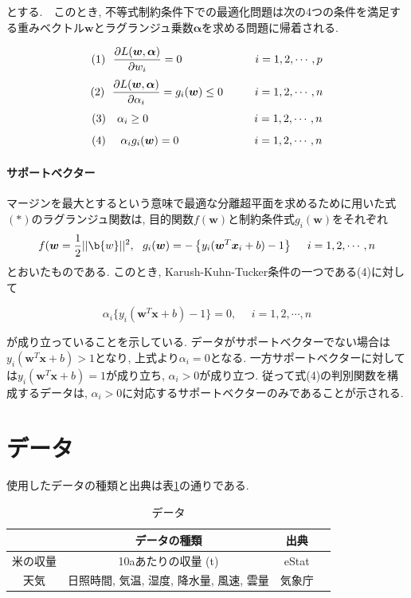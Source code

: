 \documentclass{jarticle}
\begin{document}
とする.　このとき, 不等式制約条件下での最適化問題は次の4つの条件を満足する重みベクトル$\bm{w}$とラグランジュ乗数$\bm{\alpha}$を求める問題に帰着される.

\[(1)\ \ \frac{\partial L(\bm{w}, \bm{\alpha})}{\partial w_i} = 0\ \ \ \hspace{16mm} \ \ \ i=1,2,\cdots, p\]
\[(2)\ \ \frac{\partial L(\bm{w}, \bm{\alpha})}{\partial \alpha_i} = g_i(\bm{w}) \leq 0\hspace{10mm} i=1,2,\cdots, n\]
\[(3)\ \ \ \alpha_i \geq 0\ \ \hspace{30mm}\ i=1,2,\cdots,n\]
\[(4)\ \ \ \ \alpha_i g_i(\bm{w}) = 0\ \ \hspace{10mm} \ \ \ \ \ \ \ \ \ \ i=1,2,\cdots,n\]

\paragraph{サポートベクター}

マージンを最大とするという意味で最適な分離超平面を求めるために用いた式$(*)$のラグランジュ関数は, 目的関数$f(\bm{w})$と制約条件式$g_i(\bm{w})$をそれぞれ
\[f(\bm{w} = \frac{1}{2}||\b{w}||^2,\ \ g_i(\bm{w}) = -\left\{ y_i (\bm{w}^T\bm{x}_i + b) - 1\right\}\ \ \ \ i=1,2,\cdots, n\]
とおいたものである.
このとき, Karush-Kuhn-Tucker条件の一つである(4)に対して

\[\alpha_i \{y_i (\bm{w}^T \bm{x} + b) - 1\} = 0,\ \ \ \ \ \ i=1,2,\cdots,n\]

が成り立っていることを示している. データがサポートベクターでない場合は$y_i(\bm{w}^T \bm{x} + b) >1$となり, 上式より$\alpha_i = 0$となる. 一方サポートベクターに対しては$y_i(\bm{w}^T \bm{x} + b) = 1$が成り立ち, $\alpha_i > 0$が成り立つ. 従って式(4)の判別関数を構成するデータは, $\alpha_i > 0$に対応するサポートベクターのみであることが示される.

\hypertarget{header-n2013}{%
\section{データ}\label{header-n2013}}
使用したデータの種類と出典は表\ref{data}の通りである.

\begin{table}[H]
\caption{データ}
\begin{tabular}{|c|c|c|c|} \hline
&データの種類&出典\\ \hline
米の収量&10aあたりの収量 (t)&eStat\\ \hline
天気&日照時間, 気温, 湿度, 降水量, 風速, 雲量&気象庁\\ \hline
\end{tabular}
\centering
\label{data}
\end{table}
\end{document}
